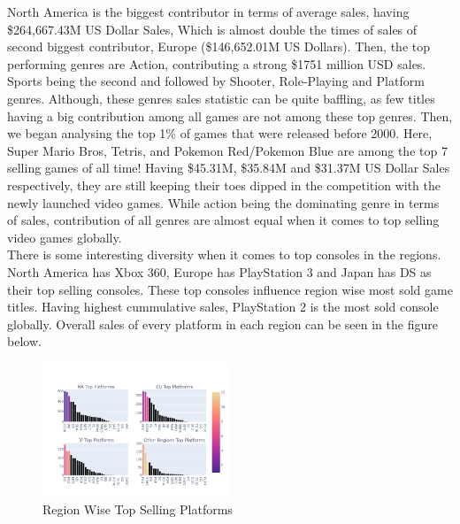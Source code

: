\documentclass[conference]{IEEEtran}
\begin{document}
North America is the biggest contributor in terms of average sales, having \$264,667.43M US Dollar Sales, Which is almost double the times of sales of second biggest contributor, Europe (\$146,652.01M US Dollars). Then, the top performing genres are Action, contributing a strong \$1751 million USD sales. Sports being the second and followed by Shooter, Role-Playing and Platform genres. Although, these genres sales statistic can be quite baffling, as few titles having a big contribution among all games are not among these top genres. Then, we began analysing the top 1\% of games that were released before 2000. Here, Super Mario Bros, Tetris, and Pokemon Red/Pokemon Blue are among the top 7 selling games of all time! Having \$45.31M, \$35.84M and \$31.37M US Dollar Sales respectively, they are still keeping their toes dipped in the competition with the newly launched video games. While action being the dominating genre in terms of sales, contribution of all genres are almost equal when it comes to top selling video games globally. \\
There is some interesting diversity when it comes to top consoles in the regions. North America has Xbox 360, Europe has PlayStation 3 and Japan has DS as their top selling consoles. These top consoles influence region wise most sold game titles. Having highest cummulative sales, PlayStation 2 is the most sold console globally. Overall sales of every platform in each region can be seen in the figure below.\\
\begin{figure}[h]
    \centering
    \includegraphics[width=0.5\textwidth]{regionplatform.png}
    \caption{Region Wise Top Selling Platforms}
\end{figure}
\end{document}
